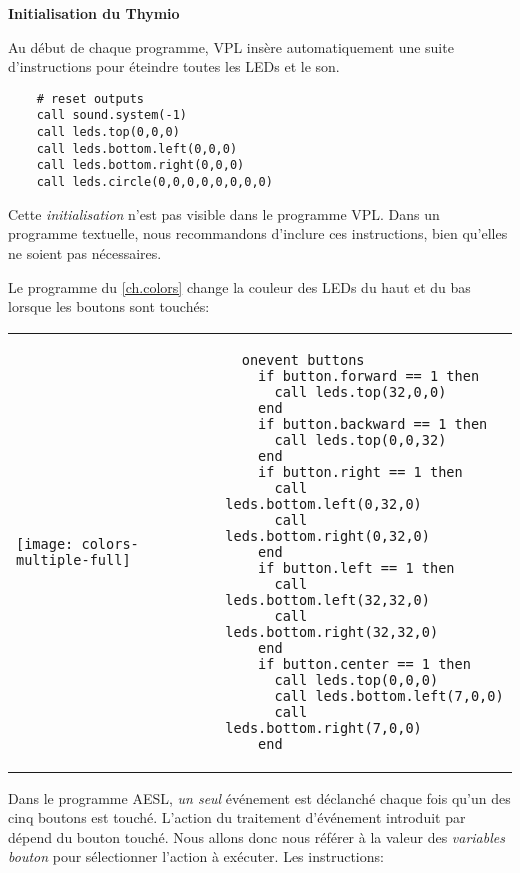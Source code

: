 \textbf{\large Initialisation du Thymio}

Au début de chaque programme,
VPL insère automatiquement une suite d'instructions 
pour éteindre toutes les LEDs et le son.

\begin{footnotesize}
\begin{verbatim}
    # reset outputs
    call sound.system(-1)
    call leds.top(0,0,0)
    call leds.bottom.left(0,0,0)
    call leds.bottom.right(0,0,0)
    call leds.circle(0,0,0,0,0,0,0,0)
\end{verbatim}
\end{footnotesize}

Cette \emph{initialisation} n'est pas visible dans le programme VPL.
Dans un programme textuelle, nous recommandons d'inclure ces instructions,
bien qu'elles ne soient pas nécessaires.


Le programme  du \cref{ch.colors} change
la couleur des LEDs du haut et du bas lorsque les boutons sont touchés:

\begin{center}
\begin{tabular}{ll}
\texttt{[image: colors-multiple-full]} &
\begin{minipage}[b]{.5\textwidth}
\begin{footnotesize}
\begin{verbatim}
  onevent buttons
    if button.forward == 1 then
      call leds.top(32,0,0)
    end
    if button.backward == 1 then
      call leds.top(0,0,32)
    end
    if button.right == 1 then
      call leds.bottom.left(0,32,0)
      call leds.bottom.right(0,32,0)
    end
    if button.left == 1 then
      call leds.bottom.left(32,32,0)
      call leds.bottom.right(32,32,0)
    end
    if button.center == 1 then
      call leds.top(0,0,0)
      call leds.bottom.left(7,0,0)
      call leds.bottom.right(7,0,0)
    end
\end{verbatim}
\end{footnotesize}
\vspace*{5ex}
\end{minipage}
\end{tabular}
\end{center}

Dans le programme AESL, \emph{un seul} événement est déclanché chaque fois qu'un des cinq boutons
est touché.
L'action du traitement d'événement introduit par 
dépend du bouton touché. Nous allons donc nous référer à la valeur des \emph{variables bouton}
pour sélectionner l'action à exécuter.
Les instructions:

